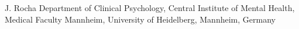 
                {J. Rocha}
                {Department of Clinical Psychology, Central Institute of Mental Health, Medical Faculty Mannheim, University of Heidelberg, Mannheim, Germany}
                